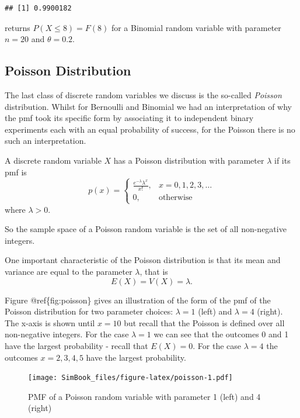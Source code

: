 \documentclass[
]{book}
\begin{document}
\begin{verbatim}
## [1] 0.9900182
\end{verbatim}

returns \(P(X\leq 8) = F(8)\) for a Binomial random variable with parameter \(n=20\) and \(\theta = 0.2\).

\hypertarget{poisson-distribution}{%
\subsection{Poisson Distribution}\label{poisson-distribution}}

The last class of discrete random variables we discuss is the so-called \emph{Poisson} distribution. Whilst for Bernoulli and Binomial we had an interpretation of why the pmf took its specific form by associating it to independent binary experiments each with an equal probability of success, for the Poisson there is no such an interpretation.

A discrete random variable \(X\) has a Poisson distribution with parameter \(\lambda\) if its pmf is
\[
p(x)=\left\{
\begin{array}{ll}
\frac{e^{-\lambda}\lambda^x}{x!}, & x = 0,1,2,3,\dots\\
0, & \mbox{otherwise}
\end{array}
\right.
\]
where \(\lambda > 0\).

So the sample space of a Poisson random variable is the set of all non-negative integers.

One important characteristic of the Poisson distribution is that its mean and variance are equal to the parameter \(\lambda\), that is
\[
E(X)= V(X) = \lambda.
\]

Figure @ref\{fig:poisson\} gives an illustration of the form of the pmf of the Poisson distribution for two parameter choices: \(\lambda=1\) (left) and \(\lambda = 4\) (right). The x-axis is shown until \(x=10\) but recall that the Poisson is defined over all non-negative integers. For the case \(\lambda=1\) we can see that the outcomes 0 and 1 have the largest probability - recall that \(E(X)=0\). For the case \(\lambda = 4\) the outcomes \(x = 2,3,4,5\) have the largest probability.

\begin{figure}
\centering
\texttt{[image: SimBook\_files/figure-latex/poisson-1.pdf]}
\caption{\label{fig:poisson}PMF of a Poisson random variable with parameter 1 (left) and 4 (right)}
\end{figure}
\end{document}

